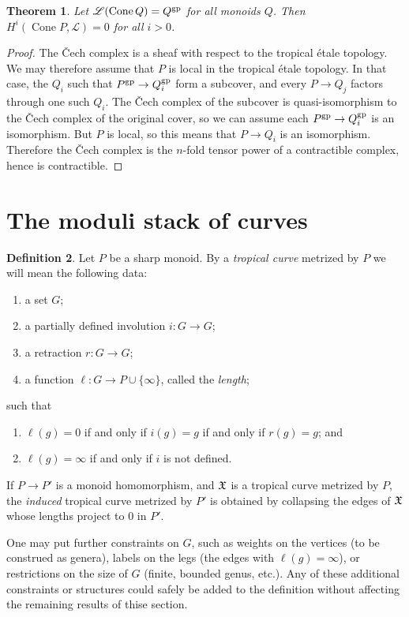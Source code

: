 \documentclass[12pt]{amsart}
\newtheorem{theorem}{Theorem}
\theoremstyle{definition}
\newtheorem{definition}[theorem]{Definition}
\theoremstyle{remark}
\def\Cone{\operatorname{Cone}}
\begin{document}
\begin{theorem}
Let $\mathscr L(\Cone Q) = Q^{\rm gp}$ for all monoids $Q$.  Then $H^i(\Cone P, \mathscr L) = 0$ for all $i > 0$.
\end{theorem}
\begin{proof}
The \v Cech complex is a sheaf with respect to the tropical \'etale topology.  We may therefore assume that $P$ is local in the tropical \'etale topology.  In that case, the $Q_i$ such that $P^{\rm gp} \to Q_i^{\rm gp}$ form a subcover, and every $P \to Q_j$ factors through one such $Q_i$.  The \v Cech complex of the subcover is quasi-isomorphism to the \v Cech complex of the original cover, so we can assume each $P^{\rm gp} \to Q_i^{\rm gp}$ is an isomorphism.  But $P$ is local, so this means that $P \to Q_i$ is an isomorphism.  Therefore the \v Cech complex is the $n$-fold tensor power of a contractible complex, hence is contractible.
\end{proof}

\section{The moduli stack of curves}

\begin{definition}
Let $P$ be a sharp monoid.  By a \emph{tropical curve} metrized by $P$ we will mean the following data:
\begin{enumerate}
\item a set $G$;
\item a partially defined involution $i : G \to G$;
\item a retraction $r : G \to G$;
\item a function $\ell : G \to P \cup \{ \infty \}$, called the \emph{length};
\end{enumerate}
such that
\begin{enumerate}[resume*]
\item $\ell(g) = 0$ if and only if $i(g) = g$ if and only if $r(g) = g$; and
\item $\ell(g) = \infty$ if and only if $i$ is not defined.
\end{enumerate}
\end{definition}

If $P \to P'$ is a monoid homomorphism, and $\frak X$ is a tropical curve metrized by $P$, the \emph{induced} tropical curve metrized by $P'$ is obtained by collapsing the edges of $\frak X$ whose lengths project to $0$ in $P'$.

One may put further constraints on $G$, such as weights on the vertices (to be construed as genera), labels on the legs (the edges with $\ell(g) = \infty$), or restrictions on the size of $G$ (finite, bounded genus, etc.).  Any of these additional constraints or structures could safely be added to the definition without affecting the remaining results of thise section.
\end{document}
